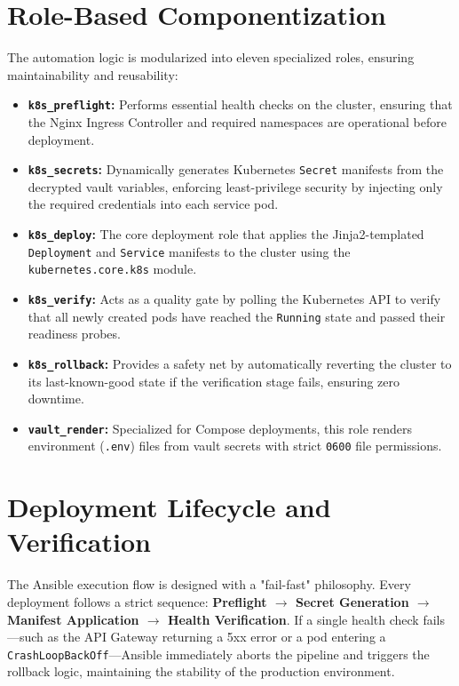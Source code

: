 \documentclass[12pt,a4paper]{report}
\begin{document}
\section{Role-Based Componentization}
The automation logic is modularized into eleven specialized roles, ensuring maintainability and reusability:
\begin{itemize}
    \item \textbf{\texttt{k8s\_preflight}:} Performs essential health checks on the cluster, ensuring that the Nginx Ingress Controller and required namespaces are operational before deployment.
    \item \textbf{\texttt{k8s\_secrets}:} Dynamically generates Kubernetes \texttt{Secret} manifests from the decrypted vault variables, enforcing least-privilege security by injecting only the required credentials into each service pod.
    \item \textbf{\texttt{k8s\_deploy}:} The core deployment role that applies the Jinja2-templated \texttt{Deployment} and \texttt{Service} manifests to the cluster using the \texttt{kubernetes.core.k8s} module.
    \item \textbf{\texttt{k8s\_verify}:} Acts as a quality gate by polling the Kubernetes API to verify that all newly created pods have reached the \texttt{Running} state and passed their readiness probes.
    \item \textbf{\texttt{k8s\_rollback}:} Provides a safety net by automatically reverting the cluster to its last-known-good state if the verification stage fails, ensuring zero downtime.
    \item \textbf{\texttt{vault\_render}:} Specialized for Compose deployments, this role renders environment (\texttt{.env}) files from vault secrets with strict \texttt{0600} file permissions.
\end{itemize}

\section{Deployment Lifecycle and Verification}
The Ansible execution flow is designed with a "fail-fast" philosophy. Every deployment follows a strict sequence: \textbf{Preflight $\rightarrow$ Secret Generation $\rightarrow$ Manifest Application $\rightarrow$ Health Verification}. If a single health check fails---such as the API Gateway returning a 5xx error or a pod entering a \texttt{CrashLoopBackOff}---Ansible immediately aborts the pipeline and triggers the rollback logic, maintaining the stability of the production environment.
\end{document}
